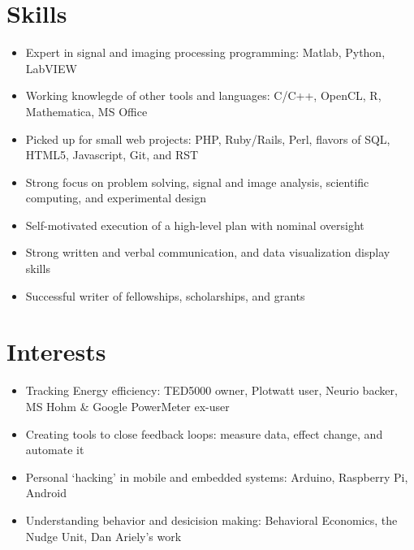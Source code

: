 \documentclass[letterpaper,10pt,english]{sphinxmanual}
\begin{document}
\section{Skills}
\label{resume:skills}\begin{itemize}
\item {} 
Expert in signal and imaging processing programming: Matlab, Python,
LabVIEW

\item {} 
Working knowlegde of other tools and languages: C/C++, OpenCL, R,
Mathematica, MS Office

\item {} 
Picked up for small web projects: PHP, Ruby/Rails, Perl, flavors of
SQL, HTML5, Javascript, Git, and RST

\item {} 
Strong focus on problem solving, signal and image analysis,
scientific computing, and experimental design

\item {} 
Self-motivated execution of a high-level plan with nominal oversight

\item {} 
Strong written and verbal communication, and data visualization
display skills

\item {} 
Successful writer of fellowships, scholarships, and grants

\end{itemize}


\section{Interests}
\label{resume:interests}\begin{itemize}
\item {} 
Tracking Energy efficiency: TED5000 owner, Plotwatt user, Neurio
backer, MS Hohm \& Google PowerMeter ex-user

\item {} 
Creating tools to close feedback loops: measure data, effect change,
and automate it

\item {} 
Personal `hacking' in mobile and embedded systems: Arduino, Raspberry
Pi, Android

\item {} 
Understanding behavior and desicision making: Behavioral Economics,
the Nudge Unit, Dan Ariely's work

\end{itemize}
\end{document}
